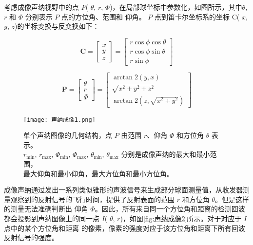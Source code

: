 考虑成像声纳视野中的点 $P$( $\theta$, $r$, $\Phi$)，在局部球坐标中参数化，如图所示，其中$\theta$, $r$ 和 $\Phi$ 分别表示 $P$ 点的方位角、范围和
仰角。 $P$ 点到笛卡尔坐标系的坐标 C( $x$, $y$, $z$)的坐标变换与反变换如下：

\begin{equation}
	\mathbf{C} = 
	\left[\!
	\begin{array}{c}
	x \\[1.8mm]
	y \\[1.8mm]
	z
	\end{array}
	\right]
	=
	\left[\!
	\begin{array}{c}
	r \cos\phi \cos\theta \\[1.8mm]
	r \cos\phi \sin\theta \\[1.8mm]
	r \sin\phi
	\end{array}
	\right]
	\label{eq:coord}
\end{equation}

\begin{equation}
	\mathbf{P} =
	\left[\!
	\begin{array}{c}
	\theta \\[1.8mm]
	r     \\[1.8mm]
	\Phi
	\end{array}
	\!\right]
	=
	\left[\!
	\begin{array}{c}
	\arctan2(y,x) \\[1.8mm]
	\sqrt{x^{2}+y^{2}+z^{2}} \\[1.8mm]
	\arctan2\!\left(z,\sqrt{x^{2}+y^{2}}\right)
	\end{array}
	\!\right]
	\label{eq:polar}
\end{equation}



\begin{figure}[ht]
\centering
\texttt{[image: 声纳成像1.png]}
\caption{单个声纳图像的几何结构，点 $P$ 由范围 $r$、仰角 $\Phi$ 和方位角 $\theta$ 表示。\\
  $r_{\min}$, $r_{\max}$, $\Phi_{\min}$, $\Phi_{\max}$, $\theta_{\min}$, $\theta_{\max}$ 分别是成像声纳的最大和最小范围，\\
  最大仰角和最小仰角，最大方位角和最小方位角。}
\label{fig:声纳成像1}
\end{figure}

成像声纳通过发出一系列类似锥形的声波信号来生成部分球面测量值，从收发器测量观察到的反射信号的飞行时间，提供了反射表面的范围 $r$ 和方位角 $\theta$。但是这样的测量无法准确判断出
仰角 $\Phi$。因此，所有来自同一个方位角和距离的检测回波都会投影到声纳图像上的同一点 $I$( $\theta$, $r$)，如图\ref{fig:声纳成像2}所示。对于对应于 $I$ 点中的某个方位角和距离
的像素，像素的强度对应于该方位角和距离下所有回波反射信号的强度。

